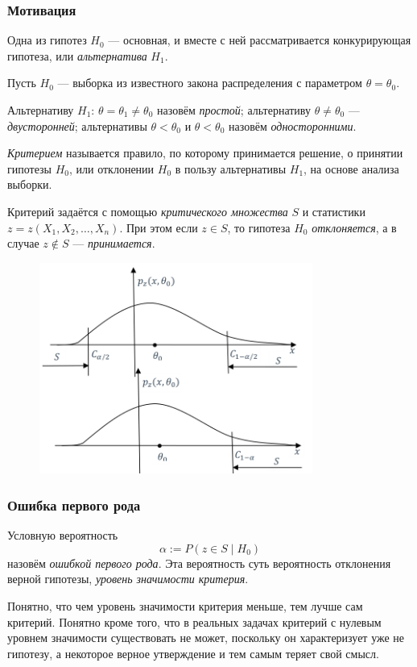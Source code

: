 \subsubsection{Мотивация}
Одна из гипотез $ H_0 $ --- основная, и вместе с ней рассматривается
конкурирующая гипотеза, или \emph{альтернатива} $ H_1 $.

\begin{definition}
Пусть $ H_0 $ --- выборка из известного закона распределения с параметром $
\theta = \theta_0 $.

Альтернативу $ H_1 $: $ \theta = \theta_1 \neq \theta_0 $ назовём
\emph{простой}; альтернативу $ \theta \neq \theta_0 $ --- \emph{двусторонней};
альтернативы $ \theta < \theta_0 $ и $ \theta < \theta_0 $ назовём
\emph{односторонними}.
\end{definition}

\begin{definition}
\emph{Критерием} называется правило, по которому принимается решение, о принятии
гипотезы $H_0$, или отклонении $ H_0 $ в пользу альтернативы $ H_1 $, на основе
анализа выборки. 
\end{definition}
Критерий задаётся с помощью \emph{критического множества} $ S $ и статистики $ z
= z(X_1, X_2, \ldots, X_n)$. При этом если $ z \in S $, то гипотеза $ H_0 $
\textsl{отклоняется}, а в случае $ z \notin S$ --- \textsl{принимается}.

\begin{figure}[h!]
	\centering
	\includegraphics[width=0.8\textwidth]{Figures/9-plot1.png}
	\caption{}
	\label{fig:9-plot1-png}
\end{figure}

\subsubsection{Ошибка первого рода}
\begin{definition}
	Условную вероятность 
	\[
			\alpha := P(z\in S \mid H_0)
	\]
назовём \emph{ошибкой первого рода}. Эта вероятность суть вероятность отклонения
верной гипотезы, \emph{уровень значимости критерия}.
\end{definition}
Понятно, что чем уровень значимости критерия меньше, тем лучше сам критерий.
Понятно кроме того, что в реальных задачах критерий с нулевым уровнем
значимости существовать не может, поскольку он характеризует уже не гипотезу, а
некоторое верное утверждение и тем
самым теряет свой смысл.
 
